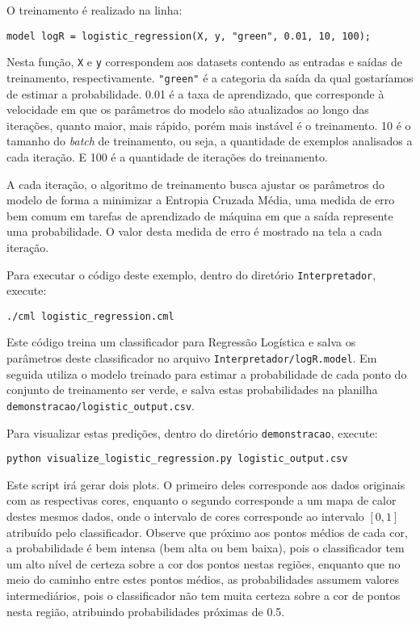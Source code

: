 \documentclass[12pt]{article}
\begin{document}
O treinamento é realizado na linha:

\begin{verbatim}
model logR = logistic_regression(X, y, "green", 0.01, 10, 100);
\end{verbatim}

Nesta função, \texttt{X} e \texttt{y} correspondem aos datasets contendo as entradas e saídas de treinamento, respectivamente. \texttt{"green"} é a categoria da saída da qual gostaríamos de estimar a probabilidade. 0.01 é a taxa de aprendizado, que corresponde à velocidade em que os parâmetros do modelo são atualizados ao longo das iterações, quanto maior, mais rápido, porém mais instável é o treinamento. 10 é o tamanho do \textit{batch} de treinamento, ou seja, a quantidade de exemplos analisados a cada iteração. E 100 é a quantidade de iterações do treinamento.

A cada iteração, o algoritmo de treinamento busca ajustar os parâmetros do modelo de forma a minimizar a Entropia Cruzada Média, uma medida de erro bem comum em tarefas de aprendizado de máquina em que a saída represente uma probabilidade. O valor desta medida de erro é mostrado na tela a cada iteração.

Para executar o código deste exemplo, dentro do diretório \texttt{Interpretador}, execute:

\begin{verbatim}
./cml logistic_regression.cml
\end{verbatim}

Este código treina um classificador para Regressão Logística e salva os parâmetros deste classificador no arquivo \texttt{Interpretador/logR.model}. Em seguida utiliza o modelo treinado para estimar a probabilidade de cada ponto do conjunto de treinamento ser verde, e salva estas probabilidades na planilha \texttt{demonstracao/logistic\_output.csv}.

Para visualizar estas predições, dentro do diretório \texttt{demonstracao}, execute:

\begin{verbatim}
python visualize_logistic_regression.py logistic_output.csv
\end{verbatim}

Este script irá gerar dois plots. O primeiro deles corresponde aos dados originais com as respectivas cores, enquanto o segundo corresponde a um mapa de calor destes mesmos dados, onde o intervalo de cores corresponde ao intervalo $[0,1]$ atribuído pelo classificador. Observe que próximo aos pontos médios de cada cor, a probabilidade é bem intensa (bem alta ou bem baixa), pois o classificador tem um alto nível de certeza sobre a cor dos pontos nestas regiões, enquanto que no meio do caminho entre estes pontos médios, as probabilidades assumem valores intermediários, pois o classificador não tem muita certeza sobre a cor de pontos nesta região, atribuindo probabilidades próximas de 0.5.
\end{document}
